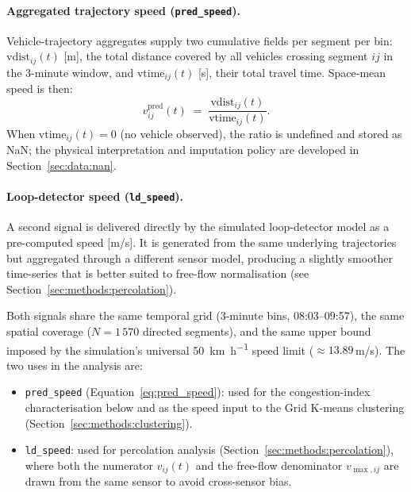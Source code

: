 \documentclass[11pt,a4paper]{article}
\begin{document}
\paragraph{Aggregated trajectory speed (\texttt{pred\_speed}).}
Vehicle-trajectory aggregates supply two cumulative fields per segment per bin:
$\text{vdist}_{ij}(t)$ [m], the total distance covered by all vehicles crossing
segment $ij$ in the 3-minute window, and $\text{vtime}_{ij}(t)$ [s], their total
travel time.  Space-mean speed is then:
\begin{equation}
  v^{\mathrm{pred}}_{ij}(t)
  \;=\; \frac{\text{vdist}_{ij}(t)}{\text{vtime}_{ij}(t)}.
  \label{eq:pred_speed}
\end{equation}
When $\text{vtime}_{ij}(t)=0$ (no vehicle observed), the ratio is undefined
and stored as NaN; the physical interpretation and imputation policy are
developed in Section~\ref{sec:data:nan}.

\paragraph{Loop-detector speed (\texttt{ld\_speed}).}
A second signal is delivered directly by the simulated loop-detector model as a
pre-computed speed [m/s].  It is generated from the same underlying trajectories
but aggregated through a different sensor model, producing a slightly smoother
time-series that is better suited to free-flow normalisation (see
Section~\ref{sec:methods:percolation}).

\medskip
\noindent Both signals share the same temporal grid (3-minute bins,
08:03--09:57), the same spatial coverage ($N = 1\,570$ directed segments),
and the same upper bound imposed by the simulation's universal
\SI{50}{\km\per\hour} speed limit ($\approx 13.89$\,m/s).  The two uses in the
analysis are:
\begin{itemize}
  \item \texttt{pred\_speed} (Equation~\ref{eq:pred_speed}): used for the
    congestion-index characterisation below and as the speed input to the Grid
    K-means clustering (Section~\ref{sec:methods:clustering}).
  \item \texttt{ld\_speed}: used for percolation analysis
    (Section~\ref{sec:methods:percolation}), where both the numerator
    $v_{ij}(t)$ and the free-flow denominator $v_{\max,ij}$ are drawn from
    the same sensor to avoid cross-sensor bias.
\end{itemize}
\end{document}
